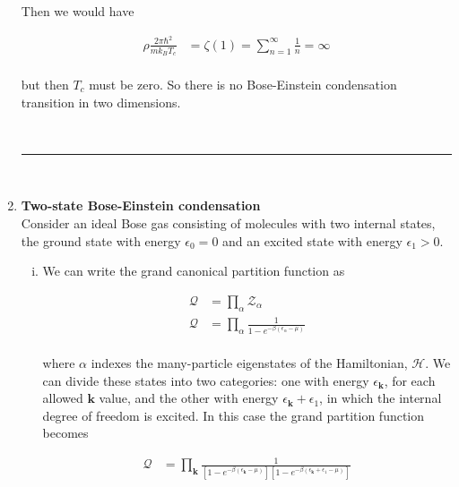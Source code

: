 \documentclass[]{article}
\begin{document}
\begin{enumerate}[1.]
Then we would have

\begin{equation}
\begin{split}
\rho \frac{2\pi \hbar^2}{mk_BT_c} & = \zeta(1) = \sum_{n=1}^{\infty} \frac{1}{n} =\infty  \\
\end{split}
\end{equation}

but then $T_c$ must be zero. So there is no Bose-Einstein condensation transition in
two dimensions.

\hfill \\
\noindent\rule{15cm}{0.4pt} \\

\item {\bf Two-state Bose-Einstein condensation}
\hfill \\
Consider an ideal Bose gas consisting of molecules with two internal states, the ground state with energy
$\epsilon_0 = 0$ and an excited state with energy $\epsilon_1 > 0$. 

\begin{enumerate}[i.]

\item We can write the grand canonical partition function as

\begin{equation}
\begin{split}
\mathcal{Q} & = \prod_\alpha \mathcal{Z}_\alpha \\
\mathcal{Q} & = \prod_\alpha \frac{  1 }{ 1-  e^{-\beta(\epsilon_\alpha -\mu )}  } \\
\end{split}
\end{equation}

where $\alpha$ indexes the many-particle eigenstates of the Hamiltonian, $\mathcal{H}$. We can divide these states into two categories: one with energy $\epsilon_{\bm{k}}$, for each allowed $\bm{k}$ value, and the other with energy $\epsilon_{\bm{k}} + \epsilon_1$, in which the internal degree of freedom is excited. In this case the grand partition function becomes

\begin{equation}
\begin{split}
\mathcal{Q} & = \prod_{\bm{k}} \frac{  1 }{ \left[ 1-  e^{-\beta(\epsilon_{\bm{k}} -\mu )}\right] \left[  1-  e^{-\beta(\epsilon_{\bm{k}} + \epsilon_1 -\mu )}  \right]  }\\
\end{split}
\end{equation}


\end{enumerate}
\end{enumerate}
\end{document}

